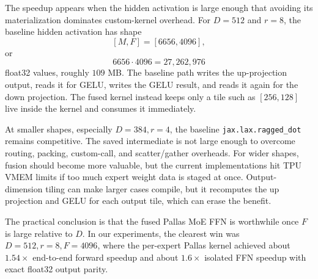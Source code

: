 \documentclass[11pt]{article}
\begin{document}
The speedup appears when the hidden activation is large enough that avoiding
its materialization dominates custom-kernel overhead. For \(D=512\) and
\(r=8\), the baseline hidden activation has shape
\[
  [M,F] = [6656,4096],
\]
or
\[
  6656\cdot 4096 = 27{,}262{,}976
\]
float32 values, roughly \(109\) MB. The baseline path writes the up-projection
output, reads it for GELU, writes the GELU result, and reads it again for the
down projection. The fused kernel instead keeps only a tile such as
\([256,128]\) live inside the kernel and consumes it immediately.

At smaller shapes, especially \(D=384,r=4\), the baseline
\texttt{jax.lax.ragged\_dot} remains competitive. The saved intermediate is not
large enough to overcome routing, packing, custom-call, and scatter/gather
overheads. For wider shapes, fusion should become more valuable, but the current
implementations hit TPU VMEM limits if too much expert weight data is staged at
once. Output-dimension tiling can make larger cases compile, but it recomputes
the up projection and GELU for each output tile, which can erase the benefit.

The practical conclusion is that the fused Pallas MoE FFN is worthwhile once
\(F\) is large relative to \(D\). In our experiments, the clearest win was
\(D=512,r=8,F=4096\), where the per-expert Pallas kernel achieved about
\(1.54\times\) end-to-end forward speedup and about \(1.6\times\) isolated FFN
speedup with exact float32 output parity.
\end{document}
